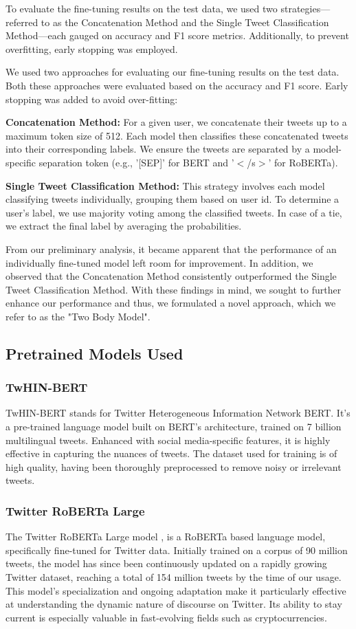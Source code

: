 \documentclass[]{ceurart}
\begin{document}
To evaluate the fine-tuning results on the test data, we used two strategies—referred to as the Concatenation Method and the Single Tweet Classification Method—each gauged on accuracy and F1 score metrics. Additionally, to prevent overfitting, early stopping was employed.

We used two approaches for evaluating our fine-tuning results on the test data. Both these approaches were evaluated based on the accuracy and F1 score. Early stopping was added to avoid over-fitting:

\textbf{Concatenation Method:} For a given user, we concatenate their tweets up to a maximum token size of 512. Each model then classifies these concatenated tweets into their corresponding labels. We ensure the tweets are separated by a model-specific separation token (e.g., '[SEP]' for BERT and '$<$/s$>$' for RoBERTa).

\textbf{Single Tweet Classification Method:} This strategy involves each model classifying tweets individually, grouping them based on user id. To determine a user's label, we use majority voting among the classified tweets. In case of a tie, we extract the final label by averaging the probabilities.

From our preliminary analysis, it became apparent that the performance of an individually fine-tuned model left room for improvement. In addition, we observed that the Concatenation Method consistently outperformed the Single Tweet Classification Method. With these findings in mind, we sought to further enhance our performance and thus, we formulated a novel approach, which we refer to as the "Two Body Model".

\subsection{Pretrained Models Used}
\subsubsection*{TwHIN-BERT}
TwHIN-BERT \cite{zhang2022twhinbert} stands for Twitter Heterogeneous Information Network BERT. It's a pre-trained language model built on BERT's architecture, trained on 7 billion multilingual tweets. Enhanced with social media-specific features, it is highly effective in capturing the nuances of tweets. The dataset used for training is of high quality, having been thoroughly preprocessed to remove noisy or irrelevant tweets.

\subsubsection*{Twitter RoBERTa Large}
The Twitter RoBERTa Large model \cite{loureiro2022timelms}, is a RoBERTa based language model, specifically fine-tuned for Twitter data. Initially trained on a corpus of 90 million tweets, the model has since been continuously updated on a rapidly growing Twitter dataset, reaching a total of 154 million tweets by the time of our usage. This model's specialization and ongoing adaptation make it particularly effective at understanding the dynamic nature of discourse on Twitter. Its ability to stay current is especially valuable in fast-evolving fields such as cryptocurrencies.
\end{document}
